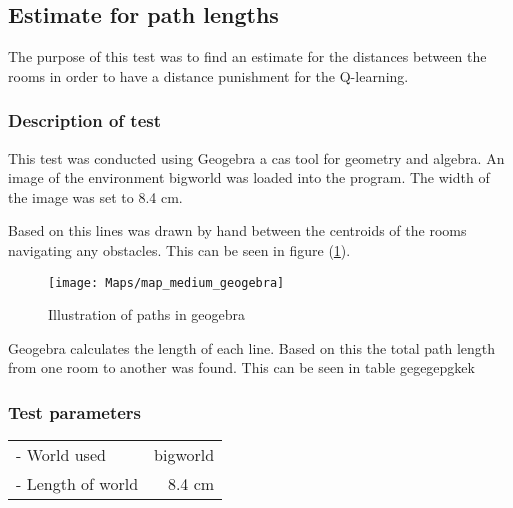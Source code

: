 \documentclass[../Head/Main.tex]{subfiles}
\begin{document}
\subsection{Estimate for path lengths}
\label{subsec:est_path_length}
The purpose of this test was to find an estimate for the distances between the rooms in order to have a distance punishment for the Q-learning.
\subsubsection*{Description of test}
This test was conducted using Geogebra a cas tool for geometry and algebra. An image of the environment bigworld was loaded into the program. The width of the image was set to 8.4 cm.\par 
Based on this lines was drawn by hand between the centroids of the rooms navigating any obstacles. This can be seen in figure (\ref{fig:geogebra}).
\begin{figure}[H]
	\centering
	\texttt{[image: Maps/map\_medium\_geogebra]}
	\caption{Illustration of paths in geogebra}
	\label{fig:geogebra}
\end{figure}
Geogebra calculates the length of each line. Based on this the total path length from one room to another was found. This can be seen in table gegegepgkek
\subsubsection*{Test parameters}
\begin{tabular}{l r}
	- World used                & bigworld\\	
	- Length of world           & 8.4 cm\\
\end{tabular}
\end{document}
